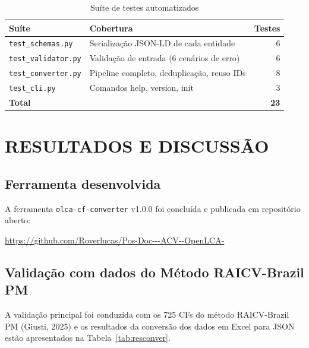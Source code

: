 \begin{table}[H]
\centering
\caption{Su\'ite de testes automatizados}
\label{tab:testeauto}
\begin{tabular}{llr}
\toprule
\textbf{Su\'ite} & \textbf{Cobertura} & \textbf{Testes} \\
\midrule
\texttt{test\_schemas.py} & Serializa\c{c}\~ao JSON-LD de cada entidade & 6 \\
\texttt{test\_validator.py} & Valida\c{c}\~ao de entrada (6 cen\'arios de erro) & 6 \\
\texttt{test\_converter.py} & Pipeline completo, deduplica\c{c}\~ao, reuso IDs & 8 \\
\texttt{test\_cli.py} & Comandos help, version, init & 3 \\
\midrule
\textbf{Total} & & \textbf{23} \\
\bottomrule
\end{tabular}
\end{table}

\section{RESULTADOS E DISCUSS\~AO}

\subsection{Ferramenta desenvolvida}

A ferramenta \texttt{olca-cf-converter} v1.0.0 foi conclu\'ida e publicada em reposit\'orio aberto:

\begin{center}
\url{https://github.com/Roverlucas/Pos-Doc---ACV--OpenLCA-}
\end{center}

\subsection{Valida\c{c}\~ao com dados do Método RAICV-Brazil PM}

A valida\c{c}\~ao principal foi conduzida com os 725 CFs do m\'etodo RAICV-Brazil PM (Giusti, 2025) e os resultados da conversão dos dados em Excel para JSON estão apresentados na Tabela~\ref{tab:resconver}.

